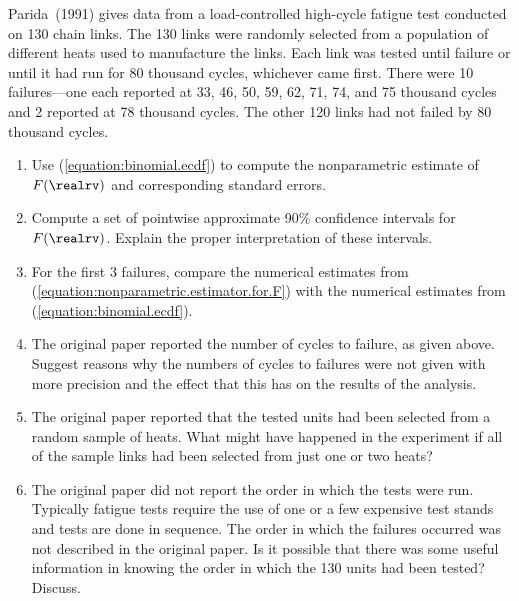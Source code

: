 \begin{exercise}
\label{exercise:parida.1991}
Parida~(1991) gives data from a load-controlled high-cycle
fatigue test conducted on 130 chain links. The 130 links were randomly
selected from a population of different heats used to manufacture the
links. Each link was tested until failure or until it had run for 80
thousand cycles, whichever came first. There were 10 failures---one
each reported at 33, 46, 50, 59, 62, 71, 74, and 75 thousand cycles
and 2 reported at 78 thousand cycles. The other 120 links had not
failed by 80 thousand cycles.
\begin{enumerate}
\item
Use (\ref{equation:binomial.ecdf}) to compute the nonparametric estimate of
$F(\realrv)$ and corresponding standard errors. 
\item
Compute a set of pointwise approximate 90\% confidence intervals for
$F(\realrv)$.  Explain the proper interpretation of these intervals.
\item
For the first 3 failures, compare the numerical estimates
from (\ref{equation:nonparametric.estimator.for.F}) with the numerical
estimates from (\ref{equation:binomial.ecdf}).
\item
The original paper reported the number of cycles to failure, as given above.
Suggest reasons why the numbers of cycles to failures were not given with more
precision and the effect that this has on the results of the analysis.
\item
The original paper reported that the tested units had been selected
from a random sample of heats. What might have happened in the
experiment if all of the sample links had been selected from just one
or two heats?
\item
The original paper did not report the order in which the tests were
run. Typically fatigue tests require the use of 
one or a few expensive test
stands and tests are done in sequence. The order in which the
failures occurred was not described in the original paper. Is it
possible that there was some useful information in knowing the order
in which the 130 units had been tested? Discuss.
\end{enumerate}
\end{exercise}

